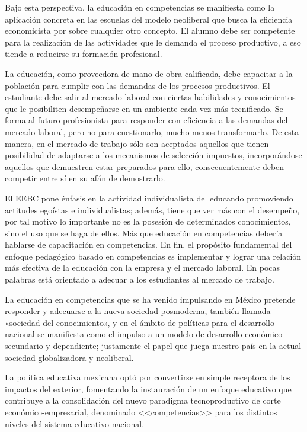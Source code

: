 Bajo esta perspectiva, la educación en competencias se manifiesta como 
la aplicación concreta en las escuelas del modelo neoliberal que busca 
la eficiencia economicista por sobre cualquier otro concepto. El alumno 
debe ser competente para la realización de las actividades que le 
demanda el proceso productivo, a eso tiende a reducirse su formación 
profesional.

La educación, como proveedora de mano de obra calificada, debe 
capacitar a la población para cumplir con las demandas de los procesos 
productivos. El estudiante debe salir al mercado laboral con ciertas\linebreak 
habilidades y conocimientos que le posibiliten desempeñarse  en un 
ambiente cada vez más tecnificado. Se forma al futuro profesionista 
para responder con eficiencia a las demandas del mercado laboral, pero 
no para cuestionarlo, mucho menos transformarlo. De esta manera, en el 
mercado de trabajo sólo son aceptados aquellos que tienen posibilidad 
de adaptarse a los mecanismos de selección impuestos, incorporándose 
aquellos que demuestren estar preparados para ello, consecuentemente 
deben competir entre sí en su afán de demostrarlo.

El EEBC pone énfasis en la actividad individualista del educando 
promoviendo actitudes egoístas e individualistas; además, tiene que ver 
más con el desempeño, por tal motivo lo importante no es la posesión de 
determinados conocimientos, sino el uso que se haga de ellos. Más que 
educación en competencias debería hablarse de capacitación en 
competencias. En fin, el propósito fundamental del enfoque pedagógico 
basado en competencias es implementar y lograr una relación más 
efectiva de la educación con la empresa y el mercado laboral. En pocas 
palabras está orientado a adecuar a los estudiantes al mercado de 
trabajo.

La educación en competencias que se ha venido impulsando en México 
pretende responder y adecuarse a la nueva sociedad posmoderna, también 
llamada «sociedad del conocimiento», y en el ámbito de políticas para 
el desarrollo nacional se manifiesta como el impulso a un modelo de 
desarrollo económico secundario y dependiente; justamente el papel que 
juega nuestro país en la actual sociedad globalizadora y neoliberal.

La política educativa mexicana optó por convertirse en simple receptora 
de los impactos del exterior, fomentando la instauración de un enfoque 
educativo que contribuye a la consolidación del nuevo paradigma 
tecnoproductivo de corte económico-empresarial, denominado 
<<competencias>> para los distintos niveles del sistema educativo 
nacional.  

